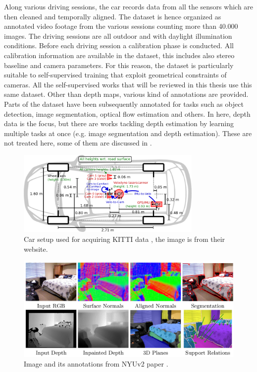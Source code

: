 Along various driving sessions, the car records data from all the sensors which are then cleaned and temporally aligned.
The dataset is hence organized as annotated video footage from the various sessions counting more than 40.000 images.
The driving sessions are all outdoor and with daylight illumination conditions.
Before each driving session a calibration phase is conducted.
All calibration information are available in the dataset, this includes also stereo baseline and camera parameters.
For this reason, the dataset is particularly suitable to self-supervised training that exploit geometrical constraints of cameras.
All the self-supervised works that will be reviewed in this thesis use this same dataset.
Other than depth maps, various kind of annotations are provided.
Parts of the dataset have been subsequently annotated for tasks such as object detection, image segmentation, optical flow estimation and others.
In here, depth data is the focus, but there are works tackling depth estimation by learning multiple tasks at once (e.g. image segmentation and depth estimation).
These are not treated here, some of them are discussed in \cite{MERTAN2022103441}.

\begin{figure}
	\centering
    \includegraphics[width=0.8\textwidth]{figs/kitti_car}
    \caption[Car setup used for collecting KITTI data.]{
        Car setup used for acquiring KITTI data \cite{KITTI}, the image is from their website.
        \label{fig:kitti_car}
    }
\end{figure}

\begin{figure}
	\centering
    \includegraphics[width=\textwidth]{figs/nyuv2_example}
    \caption[Examples from NYUv2 dataset.]{
        Image and its annotations from NYUv2 paper \cite{NYUv2}.
        \label{fig:nyuv2_example}
    }
\end{figure}

